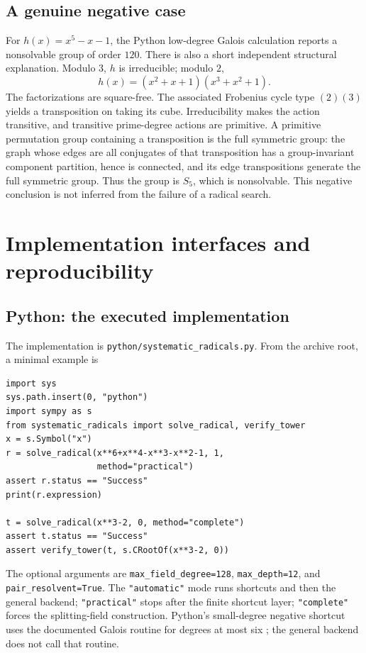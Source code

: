 \documentclass[11pt,letterpaper]{article}
\theoremstyle{definition}\newtheorem{definition}[theorem]{Definition}
\theoremstyle{remark}\newtheorem{remark}[theorem]{Remark}
\newcommand{\code}[1]{\texttt{#1}}
\begin{document}
\subsection{A genuine negative case}
For $h(x)=x^5-x-1$, the Python low-degree Galois calculation reports a
nonsolvable group of order $120$. There is also a short independent
structural explanation. Modulo $3$, $h$ is irreducible; modulo $2$,
\[
 h(x)=(x^2+x+1)(x^3+x^2+1).
\]
The factorizations are square-free. The associated Frobenius cycle type
$(2)(3)$ yields a transposition on taking its cube. Irreducibility makes
the action transitive, and transitive prime-degree actions are primitive.
A primitive permutation group containing a transposition is the full
symmetric group: the graph whose edges are all conjugates of that
transposition has a group-invariant component partition, hence is
connected, and its edge transpositions generate the full symmetric group.
Thus the group is $S_5$, which is nonsolvable. This negative conclusion is
not inferred from the failure of a radical search.

\section{Implementation interfaces and reproducibility}
\label{sec:implementation}
\subsection{Python: the executed implementation}
The implementation is \code{python/systematic\_radicals.py}. From the
archive root, a minimal example is
\begin{lstlisting}
import sys
sys.path.insert(0, "python")
import sympy as s
from systematic_radicals import solve_radical, verify_tower
x = s.Symbol("x")
r = solve_radical(x**6+x**4-x**3-x**2-1, 1,
                  method="practical")
assert r.status == "Success"
print(r.expression)

t = solve_radical(x**3-2, 0, method="complete")
assert t.status == "Success"
assert verify_tower(t, s.CRootOf(x**3-2, 0))
\end{lstlisting}
The optional arguments are \code{max\_field\_degree=128},
\code{max\_depth=12}, and \code{pair\_resolvent=True}.
The \code{"automatic"} mode runs shortcuts and then the general backend;
\code{"practical"} stops after the finite shortcut layer; \code{"complete"}
forces the splitting-field construction. Python's small-degree negative
shortcut uses the documented Galois routine for degrees at most six
\cite{sympy}; the general backend does not call that routine.
\end{document}
